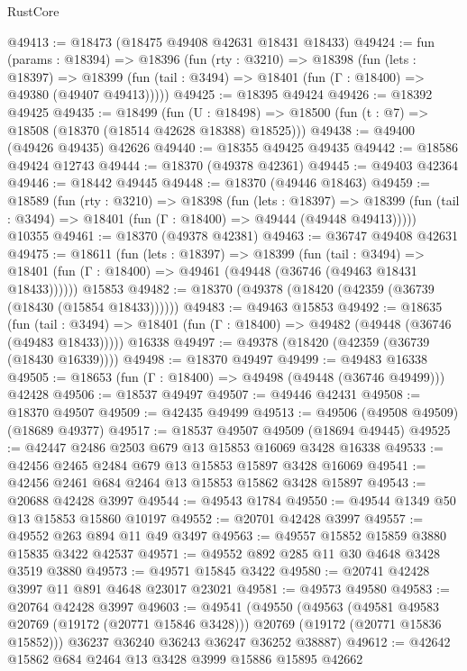 \begin{lexlean}{RustCore}
\begin{coremodule}
@49413 := @18473 (@18475 @49408 @42631 @18431 @18433)
@49424 := fun (params : @18394) =>
  @18396
    (fun (rty : @3210) =>
    @18398
      (fun (lets : @18397) =>
      @18399 (fun (tail : @3494) => @18401 (fun (Γ : @18400) => @49380 (@49407 @49413)))))
@49425 := @18395 @49424
@49426 := @18392 @49425
@49435 := @18499
    (fun (U : @18498) => @18500 (fun (t : @7) => @18508 (@18370 (@18514 @42628 @18388) @18525)))
@49438 := @49400 (@49426 @49435) @42626
@49440 := @18355 @49425 @49435
@49442 := @18586 @49424 @12743
@49444 := @18370 (@49378 @42361)
@49445 := @49403 @42364
@49446 := @18442 @49445
@49448 := @18370 (@49446 @18463)
@49459 := @18589
    (fun (rty : @3210) =>
    @18398
      (fun (lets : @18397) =>
      @18399 (fun (tail : @3494) => @18401 (fun (Γ : @18400) => @49444 (@49448 @49413)))))
    @10355
@49461 := @18370 (@49378 @42381)
@49463 := @36747 @49408 @42631
@49475 := @18611
    (fun (lets : @18397) =>
    @18399
      (fun (tail : @3494) =>
      @18401 (fun (Γ : @18400) => @49461 (@49448 (@36746 (@49463 @18431 @18433))))))
    @15853
@49482 := @18370 (@49378 (@18420 (@42359 (@36739 (@18430 (@15854 @18433))))))
@49483 := @49463 @15853
@49492 := @18635
    (fun (tail : @3494) => @18401 (fun (Γ : @18400) => @49482 (@49448 (@36746 (@49483 @18433)))))
    @16338
@49497 := @49378 (@18420 (@42359 (@36739 (@18430 @16339))))
@49498 := @18370 @49497
@49499 := @49483 @16338
@49505 := @18653 (fun (Γ : @18400) => @49498 (@49448 (@36746 @49499))) @42428
@49506 := @18537 @49497
@49507 := @49446 @42431
@49508 := @18370 @49507
@49509 := @42435 @49499
@49513 := @49506 (@49508 @49509) (@18689 @49377)
@49517 := @18537 @49507 @49509 (@18694 @49445)
@49525 := @42447 @2486 @2503 @679 @13 @15853 @16069 @3428 @16338
@49533 := @42456 @2465 @2484 @679 @13 @15853 @15897 @3428 @16069
@49541 := @42456 @2461 @684 @2464 @13 @15853 @15862 @3428 @15897
@49543 := @20688 @42428 @3997
@49544 := @49543 @1784
@49550 := @49544 @1349 @50 @13 @15853 @15860 @10197
@49552 := @20701 @42428 @3997
@49557 := @49552 @263 @894 @11 @49 @3497
@49563 := @49557 @15852 @15859 @3880 @15835 @3422 @42537
@49571 := @49552 @892 @285 @11 @30 @4648 @3428 @3519 @3880
@49573 := @49571 @15845 @3422
@49580 := @20741 @42428 @3997 @11 @891 @4648 @23017 @23021
@49581 := @49573 @49580
@49583 := @20764 @42428 @3997
@49603 := @49541
    (@49550
      (@49563
        (@49581 @49583 @20769 (@19172 (@20771 @15846 @3428)))
        @20769
        (@19172 (@20771 @15836 @15852)))
      @36237
      @36240
      @36243
      @36247
      @36252
      @38887)
@49612 := @42642 @15862 @684 @2464 @13 @3428 @3999 @15886 @15895 @42662

\end{coremodule}
\end{lexlean}
